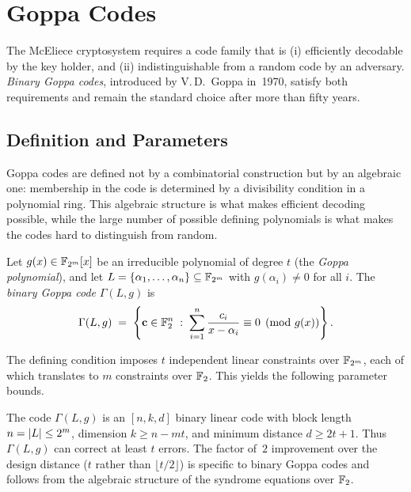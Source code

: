 \section{Goppa Codes}
\label{sec:goppa}

The McEliece cryptosystem requires a code family that is (i) efficiently decodable by the key holder, and (ii) indistinguishable from a random code by an adversary.  \emph{Binary Goppa codes}, introduced by V.\,D.\ Goppa in~1970, satisfy both requirements and remain the standard choice after more than fifty years.

\subsection{Definition and Parameters}
\label{subsec:goppa-def}

Goppa codes are defined not by a combinatorial construction but by an algebraic one: membership in the code is determined by a divisibility condition in a polynomial ring.  This algebraic structure is what makes efficient decoding possible, while the large number of possible defining polynomials is what makes the codes hard to distinguish from random.

\begin{definition}
\label{def:goppa-code}
Let $g(x) \in \mathbb{F}_{2^m}[x]$ be an irreducible polynomial of degree $t$ (the \emph{Goppa polynomial}), and let $L = \{\alpha_1, \ldots, \alpha_n\} \subseteq \mathbb{F}_{2^m}$ with $g(\alpha_i) \neq 0$ for all $i$.  The \emph{binary Goppa code} $\Gamma(L, g)$ is
\begin{equation}
\label{eq:goppa-code}
\Gamma(L, g) \;=\; \left\{ \mathbf{c} \in \mathbb{F}_2^n \;:\; \sum_{i=1}^{n} \frac{c_i}{x - \alpha_i} \equiv 0 \pmod{g(x)} \right\}.
\end{equation}
\end{definition}

The defining condition imposes $t$ independent linear constraints over $\mathbb{F}_{2^m}$, each of which translates to $m$ constraints over $\mathbb{F}_2$.  This yields the following parameter bounds.

\begin{theorem}
\label{thm:goppa-params}
The code $\Gamma(L, g)$ is an $[n, k, d]$ binary linear code with block length $n = \left\lvert L \right\rvert \leq 2^m$, dimension $k \geq n - mt$, and minimum distance $d \geq 2t + 1$.  Thus $\Gamma(L, g)$ can correct at least $t$ errors.  The factor of~$2$ improvement over the design distance ($t$ rather than $\lfloor t/2 \rfloor$) is specific to binary Goppa codes and follows from the algebraic structure of the syndrome equations over $\mathbb{F}_2$.
\end{theorem}


